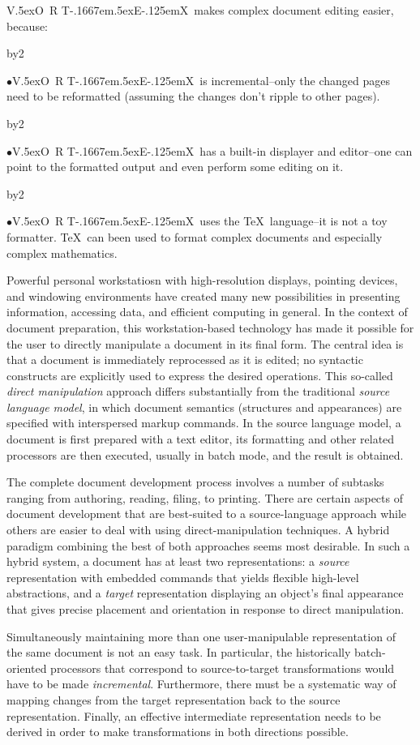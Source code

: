 \magnification{}
\def\VorTeX{V\kern-2.7pt\lower.5ex\hbox{O\kern-1.4pt R}\kern-2.6pt
  T\kern-.1667em\lower.5ex\hbox{E}\kern-.125emX}
\def\myitem#1#2{\bgroup
  \advance\rightskip by2\parindent
  \medskip
  \item{#1}{#2}\par
  \egroup}
\def\bul{$\bullet$}


\noindent \VorTeX\ makes complex document editing easier, because:

\myitem{\bul}{\VorTeX\ is incremental--only the changed pages need
to be reformatted (assuming the changes don't ripple to other pages).}

\myitem{\bul}{\VorTeX\ has a built-in displayer and editor--one can
point to the formatted output and even perform some editing on it.}

\myitem{\bul}{\VorTeX\ uses the \TeX\ language--it is not a toy
formatter.  \TeX\ can been used to format complex documents and
especially complex mathematics.}

\bigskip
Powerful personal workstatiosn with high-resolution displays, pointing
devices, and windowing environments have created many new
possibilities in presenting information, accessing data, and efficient
computing in general.  In the context of document preparation, this
workstation-based technology has made it possible for the user to
directly manipulate a document in its final form.  The central idea is
that a document is immediately reprocessed as it is edited; no
syntactic constructs are explicitly used to express the desired
operations.  This so-called {\it direct manipulation\/} approach
differs substantially from the traditional {\it source language
model\/}, in which document semantics (structures and appearances) are
specified with interspersed markup commands.  In the source language
model, a document is first prepared with a text editor, its formatting
and other related processors are then executed, usually in batch mode,
and the result is obtained.

The complete document development process involves a number of
subtasks ranging from authoring, reading, filing, to printing.  There
are certain aspects of document development that are best-suited to a
source-language approach while others are easier to deal with using
direct-manipulation techniques.  A hybrid paradigm combining the best
of both approaches seems most desirable.  In such a hybrid system, a
document has at least two representations: a {\it source\/}
representation with embedded commands that yields flexible high-level
abstractions, and a {\it target\/} representation displaying an
object's final appearance that gives precise placement and orientation
in response to direct manipulation.

Simultaneously maintaining more than one user-manipulable
representation of the same document is not an easy task.  In
particular, the historically batch-oriented processors that correspond
to source-to-target transformations would have to be made {\it
incremental\/}.  Furthermore, there must be a systematic way of
mapping changes from the target representation back to the source
representation.  Finally, an effective intermediate representation
needs to be derived in order to make transformations in both
directions possible.

\bye
